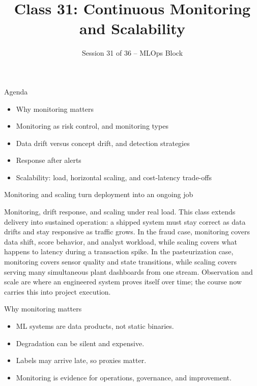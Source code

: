 

\title{Class 31: Continuous Monitoring and Scalability}
\subtitle{Session 31 of 36 -- MLOps Block}
\author{\coursename}
\date{}



\frame{\titlepage \coursefooter}

\begin{frame}{Agenda}
\begin{itemize}
\item Why monitoring matters
\item Monitoring as risk control, and monitoring types
\item Data drift versus concept drift, and detection strategies
\item Response after alerts
\item Scalability: load, horizontal scaling, and cost-latency trade-offs
\end{itemize}
\coursefooter
\end{frame}

\begin{frame}{Monitoring and scaling turn deployment into an ongoing job}
\coursefooter
\end{frame}

\coursecontextframe
{Monitoring, drift response, and scaling under real load.}
{This class extends delivery into sustained operation: a shipped system must stay correct as data drifts and stay responsive as traffic grows.}
{In the fraud case, monitoring covers data shift, score behavior, and analyst workload, while scaling covers what happens to latency during a transaction spike.}
{In the pasteurization case, monitoring covers sensor quality and state transitions, while scaling covers serving many simultaneous plant dashboards from one stream.}
{Observation and scale are where an engineered system proves itself over time; the course now carries this into project execution.}

\begin{frame}{Why monitoring matters}
\begin{itemize}
\item ML systems are data products, not static binaries.
\item Degradation can be silent and expensive.
\item Labels may arrive late, so proxies matter.
\item Monitoring is evidence for operations, governance, and improvement.
\end{itemize}
\coursefooter
\end{frame}

